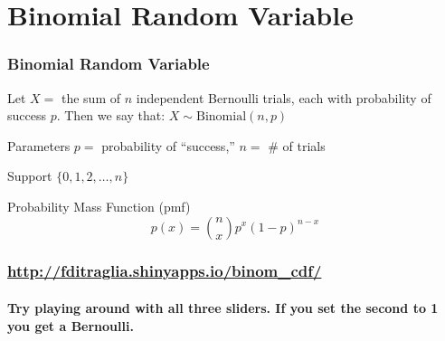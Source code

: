 \section{Binomial Random Variable}

\begin{frame}
\frametitle{Binomial Random Variable}
Let $X = $ the sum of $n$ independent Bernoulli trials, each with probability of success $p$.  \alert{Then we say that:
		$X \sim \mbox{Binomial}(n,p)$} 

\vspace{2em}
\begin{block}{Parameters}
$p =$ probability of ``success,'' $n=$ \# of trials
\end{block}
\begin{block}{Support} 
$\{0, 1, 2, \hdots, n\}$ 
\end{block}
\begin{block}{Probability Mass Function (pmf)} 
$$p(x) = {n \choose x} p^x (1-p)^{n-x}$$ 
\end{block}
\end{frame}

\begin{frame}
	\frametitle{\href{https://fditraglia.shinyapps.io/binom_cdf/}{http://fditraglia.shinyapps.io/binom\_cdf/}}
\framesubtitle{Try playing around with all three sliders. If you set the second to 1 you get a Bernoulli.}

\begin{figure}
\end{figure}

\end{frame}



%
%
%
%
%
%

